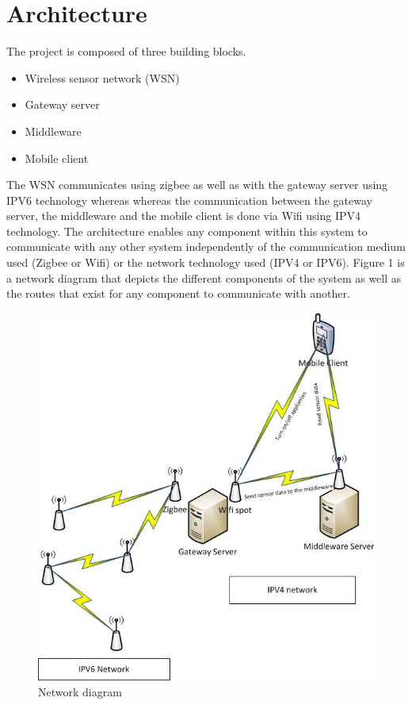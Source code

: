 \documentclass[conference]{IEEEtran}
\begin{document}
\section{Architecture}
The project is composed of three building blocks. 
\begin{itemize}
\item Wireless sensor network (WSN)
\item Gateway server
\item Middleware
\item Mobile client
\end{itemize}
The WSN communicates using zigbee as well as with the gateway server using IPV6 technology whereas whereas the communication between the gateway server, the middleware and the mobile client is done via Wifi using IPV4 technology. The architecture enables any component within this system to communicate with any other system independently of the communication medium used (Zigbee or Wifi) or the network technology used (IPV4 or IPV6). Figure 1 is a network diagram that depicts the different components of the system as well as the routes that exist for any component to communicate with another.

\begin{figure}[htbp]
\centering
\includegraphics[scale=0.5]{images/network_diagram.jpg}
\caption{Network diagram}
\label{fig:network}
\end{figure}
\end{document}
